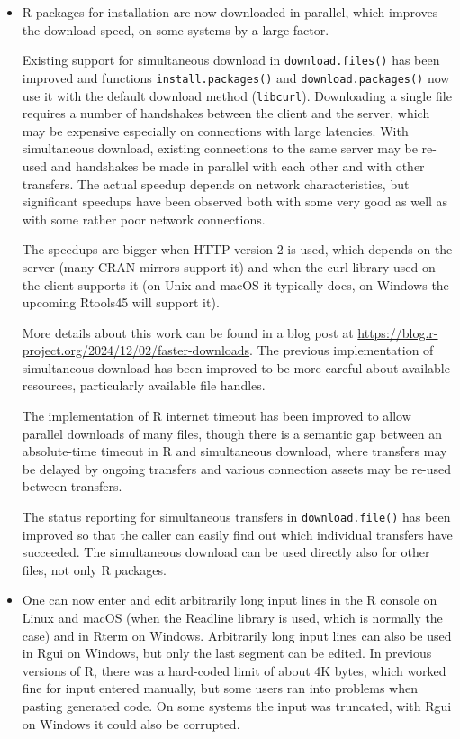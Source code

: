 \begin{itemize}
\item
  R packages for installation are now downloaded in parallel, which improves
  the download speed, on some systems by a large factor.

  Existing support for simultaneous download in \texttt{download.files()} has been
  improved and functions \texttt{install.packages()} and \texttt{download.packages()} now
  use it with the default download method (\texttt{libcurl}). Downloading a single
  file requires a number of handshakes between the client and the server,
  which may be expensive especially on connections with large latencies.
  With simultaneous download, existing connections to the same server may be
  re-used and handshakes be made in parallel with each other and with other
  transfers. The actual speedup depends on network characteristics, but
  significant speedups have been observed both with some very good as well
  as with some rather poor network connections.

  The speedups are bigger when HTTP version 2 is used, which depends on the
  server (many CRAN mirrors support it) and when the curl library used on
  the client supports it (on Unix and macOS it typically does, on Windows
  the upcoming Rtools45 will support it).

  More details about this work can be found in a blog post at
  \url{https://blog.r-project.org/2024/12/02/faster-downloads}. The previous
  implementation of simultaneous download has been improved to be more
  careful about available resources, particularly available file handles.

  The implementation of R internet timeout has been improved to allow
  parallel downloads of many files, though there is a semantic gap between
  an absolute-time timeout in R and simultaneous download, where transfers
  may be delayed by ongoing transfers and various connection assets may be
  re-used between transfers.

  The status reporting for simultaneous transfers in \texttt{download.file()} has
  been improved so that the caller can easily find out which individual
  transfers have succeeded. The simultaneous download can be used directly
  also for other files, not only R packages.
\item
  One can now enter and edit arbitrarily long input lines in the R console on
  Linux and macOS (when the Readline library is used, which is normally the case) and
  in Rterm on Windows. Arbitrarily long input lines can also be used in
  Rgui on Windows, but only the last segment can be edited. In previous
  versions of R, there was a hard-coded limit of about 4K bytes, which
  worked fine for input entered manually, but some users ran into problems
  when pasting generated code. On some systems the input was truncated,
  with Rgui on Windows it could also be corrupted.


\end{itemize}

